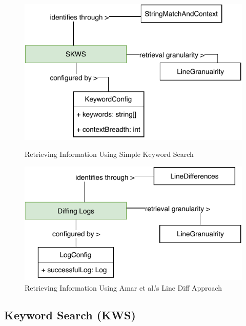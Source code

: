 \documentclass[\myrootdir/main.tex]{subfiles}
\begin{document}
\begin{figure}[htbp]
	\centering
	\begin{minipage}{0.45\textwidth}
		\centering
		\includegraphics[width=\textwidth, clip]{img/skws-technique.pdf}
		\caption{Retrieving Information Using Simple Keyword Search}
		\label{fig:keyword-search-explanation}
	\end{minipage}\hfill
	\begin{minipage}{0.45\textwidth}
		\centering
		\includegraphics[width=\textwidth, clip]{img/diff-technique.pdf}
		\caption{Retrieving Information Using Amar et al.'s Line Diff Approach}
		\label{fig:diff-technique-model}
	\end{minipage}
\end{figure}

\subsection{Keyword Search (KWS)}
\label{sec:expl-skws}
\end{document}
